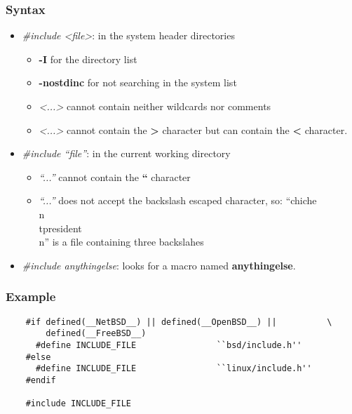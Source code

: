 \documentclass[9pt]{beamer}
\begin{document}
\begin{frame}
  \frametitle{Syntax}

  \begin{itemize}
    \item
      \textit{\#include <file>}: in the system header directories

      \begin{itemize}
	\item
	  \textbf{-I} for the directory list
	\item
	  \textbf{-nostdinc} for not searching in the system list
	\item
	  \textit{<...>} cannot contain neither wildcards nor comments
	\item
	  \textit{<...>} cannot contain the \textbf{>} character but
	  can contain the \textbf{<} character.
      \end{itemize}

    \item
      \textit{\#include ``file''}: in the current working directory

      \begin{itemize}
	\item
	  \textit{``...''} cannot contain the \textbf{``} character
	\item
	  \textit{``...''} does not accept the backslash escaped character,
	  so: ``chiche\\n\\tpresident\\n'' is a file containing
	  three backslahes
      \end{itemize}

    \item
      \textit{\#include anythingelse}: looks for a macro named
      \textbf{anythingelse}.
  \end{itemize}
\end{frame}


\begin{frame}[containsverbatim]
  \frametitle{Example}

  \begin{verbatim}
    #if defined(__NetBSD__) || defined(__OpenBSD__) ||          \
        defined(__FreeBSD__)
      #define INCLUDE_FILE                ``bsd/include.h''
    #else
      #define INCLUDE_FILE                ``linux/include.h''
    #endif

    #include INCLUDE_FILE
  \end{verbatim}
\end{frame}
\end{document}
